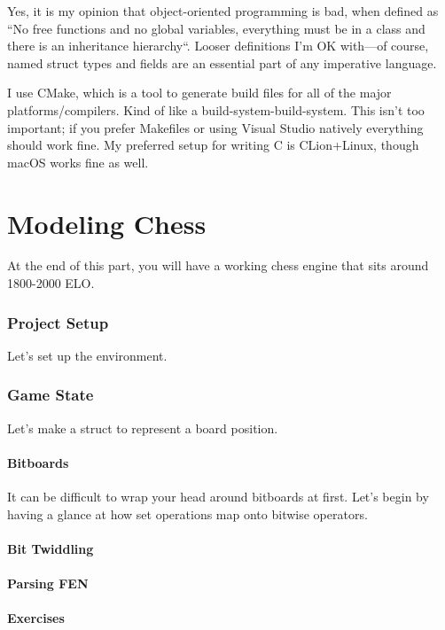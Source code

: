 \documentclass[letterpaper,11pt]{article}
\begin{document}
Yes, it is my opinion that object-oriented programming is bad, when defined as 
``No free functions and no global variables, everything must be in a class and there is an inheritance hierarchy``.
Looser definitions I'm OK with---of course, 
named struct types and fields are an essential part of any imperative language. 

I use CMake, which is a tool to generate build files for all of the major platforms/compilers. 
Kind of like a build-system-build-system. This isn't too important; if you prefer Makefiles or 
using Visual Studio natively everything should work fine. 
My preferred setup for writing C is CLion+Linux, though macOS works fine as well. 

\part{Modeling Chess}

At the end of this part, you will have a working chess engine that sits around 1800-2000 ELO. 

\section{Project Setup}

Let's set up the environment.

\section{Game State}

Let's make a struct to represent a board position.

\subsection{Bitboards}

It can be difficult to wrap your head around bitboards at first. Let's begin by having a glance at 
how set operations map onto bitwise operators.

\subsection{Bit Twiddling}
\subsection{Parsing FEN}
\subsection{Exercises}
\end{document}

